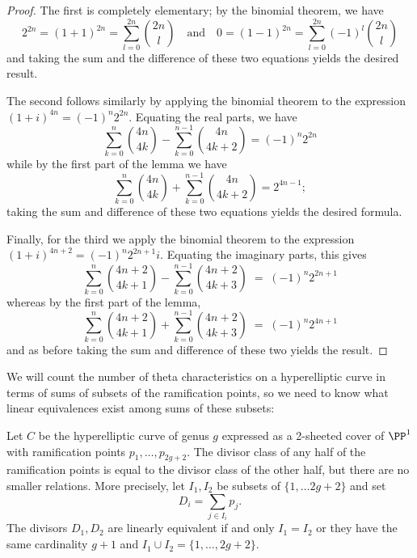 \begin{proof}
The first is completely elementary; by the binomial theorem, we have
$$
2^{2n} = (1+1)^{2n} = \sum_{l = 0}^{2n} \binom{2n}{l} \quad \text{and} \quad 0 = (1-1)^{2n} = \sum_{l = 0}^{2n} (-1)^l\binom{2n}{l}
$$
and taking the sum and the difference of these two equations yields the desired result.

The second  follows similarly by applying the binomial theorem to the expression $(1 + i)^{4n} = (-1)^n2^{2n}$. Equating the real parts, we have
$$
\sum_{k=0}^n \binom{4n}{4k} - \sum_{k=0}^{n-1} \binom{4n}{4k+2} = (-1)^n2^{2n}
$$
while by the first part of the lemma we have
$$
\sum_{k=0}^n \binom{4n}{4k} + \sum_{k=0}^{n-1} \binom{4n}{4k+2} = 2^{4n-1};
$$
taking the sum and difference of these two equations yields the desired formula.

Finally, for the third we apply the binomial theorem to the expression $(1 + i)^{4n+2} = (-1)^n2^{2n+1}i$. Equating the imaginary parts, this gives
$$
\sum_{k=0}^n \binom{4n+2}{4k+1} - \sum_{k=0}^{n-1} \binom{4n+2}{4k+3} \; = \; (-1)^n2^{2n+1}
$$
whereas by the first part of the lemma,
$$
\sum_{k=0}^n \binom{4n+2}{4k+1} + \sum_{k=0}^{n-1} \binom{4n+2}{4k+3} \; = \; (-1)^n 2^{4n+1}
$$
and as before taking the sum and difference of these two yields the result.
\end{proof}

We will count the number of theta characteristics on a hyperelliptic curve in terms of sums of subsets of the ramification points, so we need to know what linear equivalences exist among sums of these subsets:

\begin{lemma}\label{ramification point relations}
Let $C$ be the hyperelliptic curve of genus $g$ expressed as a 2-sheeted cover of $\PP^1$ with ramification points $p_1,\dots,p_{2g+2}$. The divisor class of
 any half of the ramification points is equal to the divisor class of the other half, but there are no
 smaller relations. More precisely,
 let $I_1,I_2$ be subsets of $\{1,\dots 2g+2\}$
and set 
$$
D_i = \sum_{j\in I_i} p_j.
$$
The divisors $D_1,D_2$ are linearly equivalent if and only $I_1 = I_2$ or they
have the same cardinality $g+1$ and $I_1\cup I_2 = \{1,\dots, 2g+2\}$.\end{lemma}

